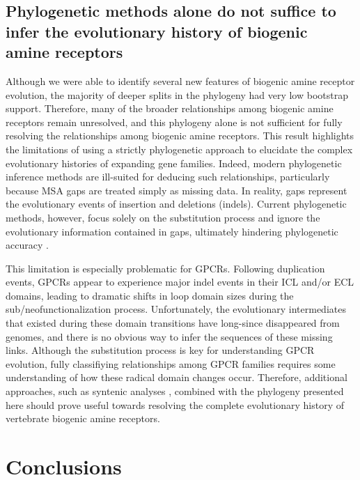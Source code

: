 \documentclass[fleqn,10pt]{wlpeerj}
\begin{document}
\subsection*{Phylogenetic methods alone do not suffice to infer the evolutionary history of biogenic amine receptors}
Although we were able to identify several new features of biogenic amine receptor evolution, the majority of deeper splits in the phylogeny had very low bootstrap support. Therefore, many of the broader relationships among biogenic amine receptors remain unresolved, and this phylogeny alone is not sufficient for fully resolving the relationships among biogenic amine receptors. This result highlights the limitations of using a strictly phylogenetic approach to elucidate the complex evolutionary histories of expanding gene families. Indeed, modern phylogenetic inference methods are ill-suited for deducing such relationships, particularly because MSA gaps are treated simply as missing data. In reality, gaps represent the evolutionary events of insertion and deletions (indels). Current phylogenetic methods, however, focus solely on the substitution process and ignore the evolutionary information contained in gaps, ultimately hindering phylogenetic accuracy \citep{Morrison2008,Loytynoja2008,Warnow2012,Luanetal2013}. 

This limitation is especially problematic for GPCRs. Following duplication events, GPCRs appear to experience major indel events in their ICL and/or ECL domains, leading to dramatic shifts in loop domain sizes during the sub/neofunctionalization process. Unfortunately, the evolutionary intermediates that existed during these domain transitions have long-since disappeared from genomes, and there is no obvious way to infer the sequences of these missing links. Although the substitution process is key for understanding GPCR evolution, fully classifiying relationships among GPCR families requires some understanding of how these radical domain changes occur. Therefore, additional approaches, such as syntenic analyses \citep{Sundstrom2010,Widmark2011,YegorovGood2012,Hwangetal2013}, combined with the phylogeny presented here should prove useful towards resolving the complete evolutionary history of vertebrate biogenic amine receptors. 


\section*{Conclusions}
\end{document}
